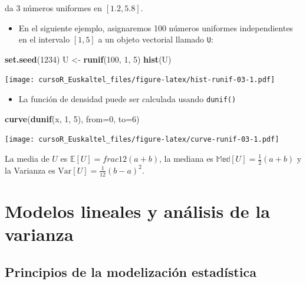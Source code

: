 \documentclass[]{book}
\newenvironment{Shaded}{\begin{snugshade}}{\end{snugshade}}
\newcommand{\KeywordTok}[1]{\textcolor[rgb]{0.13,0.29,0.53}{\textbf{#1}}}
\newcommand{\DataTypeTok}[1]{\textcolor[rgb]{0.13,0.29,0.53}{#1}}
\newcommand{\DecValTok}[1]{\textcolor[rgb]{0.00,0.00,0.81}{#1}}
\newcommand{\StringTok}[1]{\textcolor[rgb]{0.31,0.60,0.02}{#1}}
\newcommand{\NormalTok}[1]{#1}
\providecommand{\tightlist}{%
  \setlength{\itemsep}{0pt}\setlength{\parskip}{0pt}}
\begin{document}
da 3 números uniformes en \([1.2,5.8]\).

\begin{itemize}
\tightlist
\item
  En el siguiente ejemplo, asignaremos 100 números uniformes
  independientes en el intervalo \([1,5]\) a un objeto vectorial llamado
  \texttt{U}:
\end{itemize}

\begin{Shaded}
\begin{Highlighting}[]
\KeywordTok{set.seed}\NormalTok{(}\DecValTok{1234}\NormalTok{)}
\NormalTok{U <-}\StringTok{ }\KeywordTok{runif}\NormalTok{(}\DecValTok{100}\NormalTok{, }\DecValTok{1}\NormalTok{, }\DecValTok{5}\NormalTok{)}
\KeywordTok{hist}\NormalTok{(U)}
\end{Highlighting}
\end{Shaded}

\texttt{[image: cursoR\_Euskaltel\_files/figure-latex/hist-runif-03-1.pdf]}

\begin{itemize}
\tightlist
\item
  La función de densidad puede ser calculada usando \texttt{dunif()}
\end{itemize}

\begin{Shaded}
\begin{Highlighting}[]
\KeywordTok{curve}\NormalTok{(}\KeywordTok{dunif}\NormalTok{(x, }\DecValTok{1}\NormalTok{, }\DecValTok{5}\NormalTok{), }\DataTypeTok{from=}\DecValTok{0}\NormalTok{, }\DataTypeTok{to=}\DecValTok{6}\NormalTok{)}
\end{Highlighting}
\end{Shaded}

\texttt{[image: cursoR\_Euskaltel\_files/figure-latex/curve-runif-03-1.pdf]}

La media de \(U\) es \(\mathbb{E}[U]=frac{1}{2}(a+b)\), la mediana es
\(\mathbb{Med}[U]=\frac{1}{2}(a+b)\) y la Varianza es
\(\mbox{Var}[U]=\frac{1}{12}(b-a)^2\).

\chapter{Modelos lineales y análisis de la
varianza}\label{modelos-lineales-y-analisis-de-la-varianza}

\section{Principios de la modelización
estadística}\label{principios-de-la-modelizacion-estadistica}
\end{document}
